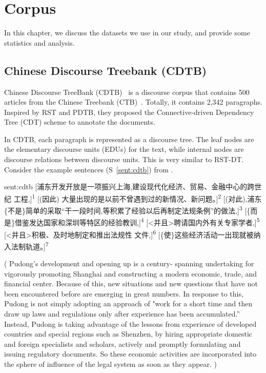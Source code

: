 %
%
%
\chapter{Corpus}
\label{c:corpus}

In this chapter, we discuss the datasets we use in our study, and
provide some statistics and analysis.

\section{Chinese Discourse Treebank (CDTB)}

Chinese Discourse TreeBank (CDTB)~\citep{li2014building} is a discourse
corpus that contains 500 articles from the Chinese Treebank (CTB)~\citep{xue2005penn}.
Totally, it contains 2,342 paragraphs.
Inspired by RST and PDTB, they proposed the Connective-driven Dependency Tree (CDT)
scheme to annotate the documents.

In CDTB, each paragraph is represented as a discourse tree. The leaf nodes are the
elementary discourse units (EDUs) for the text, while internal nodes are discourse
relations between discourse units. This is very similar to RST-DT.
Consider the example sentences (S~\ref{sent:cdtb}) from \cite{li2014building}.

\begin{sent}{sent:cdtb}{}
[浦东开发开放是一项振兴上海,建设现代化经济、贸易、金融中心的跨世纪
工程,]\textsuperscript{1}
[(因此) 大量出现的是以前不曾遇到过的新情况、新问题。]\textsuperscript{2}
[(对此),浦东\{不是\}简单的采取“干一段时间,等积累了经验以后再制定法规条例”的做法,]\textsuperscript{3}
[\{而是\}借鉴发达国家和深圳等特区的经验教训,]\textsuperscript{4}
[<并且>聘请国内外有关专家学者,]\textsuperscript{5}
[<并且>积极、及时地制定和推出法规性 文件,]\textsuperscript{6}
[\{使\}这些经济活动一出现就被纳入法制轨道。]\textsuperscript{7}

(
Pudong's development and opening up is a century-
spanning undertaking for vigorously promoting Shanghai and
constructing a modern economic, trade, and financial center.
Because of this, new situations and new questions that have
not been encountered before are emerging in great numbers.
In response to this, Pudong is not simply adopting an approach
of "work for a short time and then draw up laws and regulations
only after experience has been accumulated.”
Instead, Pudong is taking advantage of the lessons from experience of
developed countries and special regions such as Shenzhen,
by hiring appropriate domestic and foreign specialists and
scholars,
actively and promptly formulating and issuing
regulatory documents.
So these economic activities are incorporated into the sphere
of influence of the legal system as soon as they appear.
)
\end{sent}


